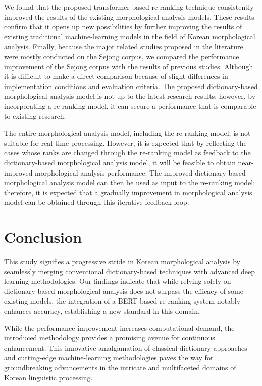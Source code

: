 \documentclass[AMS,STIX2COL]{WileyNJD-v2}
\begin{document}
    We found that the proposed transformer-based re-ranking technique consistently improved the results of the existing morphological analysis models.
    These results confirm that it opens up new possibilities by further improving the results of existing traditional machine-learning models in the field of Korean morphological analysis.
    Finally, because the major related studies proposed in the literature were mostly conducted on the Sejong corpus, we compared the performance improvement of the Sejong corpus with the results of previous studies.
    Although it is difficult to make a direct comparison because of slight differences in implementation conditions and evaluation criteria.
    The proposed dictionary-based morphological analysis model is not up to the latest research results; however, by incorporating a re-ranking model, it can secure a performance that is comparable to existing research.

    The entire morphological analysis model, including the re-ranking model, is not suitable for real-time processing.
    However, it is expected that by reflecting the cases whose ranks are changed through the re-ranking model as feedback to the dictionary-based morphological analysis model, it will be feasible to obtain near-improved morphological analysis performance.
    The improved dictionary-based morphological analysis model can then be used as input to the re-ranking model; therefore, it is expected that a gradually improvement in morphological analysis model can be obtained through this iterative feedback loop.


    \section{Conclusion}\label{sec:conclusion}

    This study signifies a progressive stride in Korean morphological analysis by seamlessly merging conventional dictionary-based techniques with advanced deep learning methodologies.
    Our findings indicate that while relying solely on dictionary-based morphological analysis does not surpass the efficacy of some existing models, the integration of a BERT-based re-ranking system notably enhances accuracy, establishing a new standard in this domain.

    While the performance improvement increases computational demand, the introduced methodology provides a promising avenue for continuous enhancement.
    This innovative amalgamation of classical dictionary approaches and cutting-edge machine-learning methodologies paves the way for groundbreaking advancements in the intricate and multifaceted domains of Korean linguistic processing.
\end{document}
